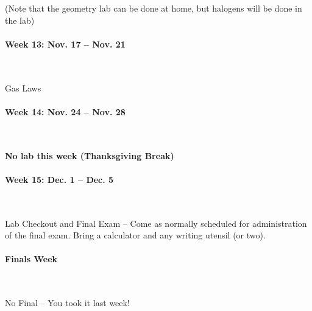 \documentclass[12pt, letterpaper]{article}
\begin{document}
(Note that the geometry lab can be done at home, but halogens will be done in the lab)

\paragraph{Week 13: Nov. 17 -- Nov. 21}~

Gas Laws

\paragraph{Week 14: Nov. 24 -- Nov. 28}~

\textbf{No lab this week (Thanksgiving Break)}

\paragraph{Week 15: Dec. 1 -- Dec. 5}~

Lab Checkout and Final Exam -- Come as normally scheduled for administration of the final exam. Bring a calculator and any writing utensil (or two).

\paragraph{Finals Week}~

No Final -- You took it last week!
\end{document}
